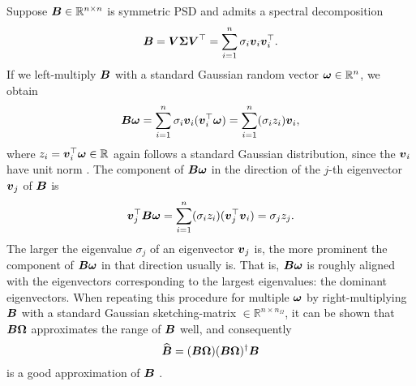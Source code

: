Suppose $\boldsymbol{B} \in \mathbb{R}^{n \times n}$ is symmetric \gls{PSD} and admits a spectral decomposition
\begin{equation}
    \boldsymbol{B}
        = \boldsymbol{V} \boldsymbol{\Sigma} \boldsymbol{V}^{\top} 
        = \sum_{i=1}^n \sigma_i \boldsymbol{v}_i \boldsymbol{v}_i^{\top}.
    \label{equ:3-nystrom-sketching-spectral-decomposition}
\end{equation}
If we left-multiply $\boldsymbol{B}$ with a standard Gaussian random vector $\boldsymbol{\omega} \in \mathbb{R}^n$,
we obtain
\begin{equation}
    \boldsymbol{B}\boldsymbol{\omega}
        = \sum_{i=1}^n \sigma_i \boldsymbol{v}_i (\boldsymbol{v}_i^{\top} \boldsymbol{\omega})
        = \sum_{i=1}^n (\sigma_i  z_i) \boldsymbol{v}_i,
        \label{equ:3-nystrom-sketching-random-multiplication}
\end{equation}
where $z_i = \boldsymbol{v}_i^{\top} \boldsymbol{\omega} \in \mathbb{R}$ again follows a
standard Gaussian distribution, since the $\boldsymbol{v}_i$ have unit norm
\cite{klenke2013probability}. The component of $\boldsymbol{B}\boldsymbol{\omega}$ in the
direction of the $j$-th eigenvector $\boldsymbol{v}_j$ of $\boldsymbol{B}$ is
\begin{equation}
    \boldsymbol{v}_j^{\top}\boldsymbol{B}\boldsymbol{\omega}
        = \sum_{i=1}^n (\sigma_i  z_i) (\boldsymbol{v}_j^{\top} \boldsymbol{v}_i)
        = \sigma_j  z_j.
        \label{equ:3-nystrom-sketching-dominant-component}
\end{equation}
The larger the eigenvalue $\sigma_j$ of an eigenvector $\boldsymbol{v}_j$ is, the
more prominent the component of $\boldsymbol{B}\boldsymbol{\omega}$ in that direction usually is.
That is, $\boldsymbol{B}\boldsymbol{\omega}$ is roughly aligned with the eigenvectors corresponding
to the largest eigenvalues: the dominant eigenvectors.
When repeating this procedure for multiple $\boldsymbol{\omega}$ by right-multiplying $\boldsymbol{B}$
with a standard Gaussian \gls{sketching-matrix} $\in \mathbb{R}^{n \times n_{\Omega}}$,
it can be shown that $\boldsymbol{B} \boldsymbol{\Omega}$ approximates the range of $\boldsymbol{B}$ well,
and consequently
\begin{equation}
    \widehat{\boldsymbol{B}} = (\boldsymbol{B} \boldsymbol{\Omega}) (\boldsymbol{B} \boldsymbol{\Omega})^{\dagger} \boldsymbol{B}
    \label{equ:3-nystrom-RSVD}
\end{equation}
is a good approximation of $\boldsymbol{B}$ \cite{halko2011finding}.\\

